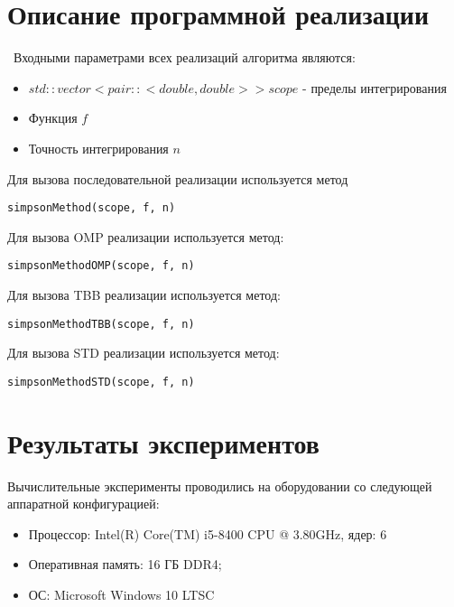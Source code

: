 \documentclass{report}
\begin{document}
\section*{Описание программной реализации}
\
Входными параметрами всех реализаций алгоритма являются:
\begin{itemize}
\item $std::vector<pair::<double, double>> scope$ - пределы интегрирования
\item Функция $f$
\item Точность интегрирования $n$
\end{itemize}

\par Для вызова последовательной реализации используется метод 
\begin{lstlisting}
simpsonMethod(scope, f, n)
\end{lstlisting}
\par Для вызова OMP реализации используется метод:
\begin{lstlisting}
simpsonMethodOMP(scope, f, n)
\end{lstlisting}
\par Для вызова TBB реализации используется метод:
\begin{lstlisting}
simpsonMethodTBB(scope, f, n)
\end{lstlisting}
\par Для вызова STD реализации используется метод:
\begin{lstlisting}
simpsonMethodSTD(scope, f, n)
\end{lstlisting}

\newpage

\section*{Результаты экспериментов}
Вычислительные эксперименты проводились на оборудовании со следующей аппаратной конфигурацией:

\begin{itemize}
\item Процессор: Intel(R) Core(TM) i5-8400 CPU @ 3.80GHz, ядер: 6
\item Оперативная память: 16 ГБ DDR4;
\item ОС: Microsoft Windows 10 LTSC
\end{itemize}
\end{document}
